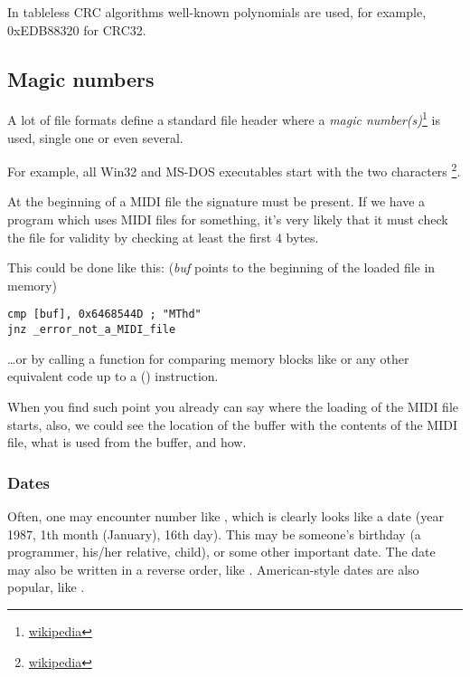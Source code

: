 In tableless CRC algorithms well-known polynomials are used, for example, 0xEDB88320 for CRC32.

\subsection{Magic numbers}
\label{magic_numbers}

\newcommand{\FNURLMAGIC}{\footnote{\href{http://go.yurichev.com/17112}{wikipedia}}}

A lot of file formats define a standard file header where a \emph{magic number(s)}\FNURLMAGIC{} is used, single one or even several.


For example, all Win32 and MS-DOS executables start with the two characters \footnote{\href{http://go.yurichev.com/17113}{wikipedia}}.


At the beginning of a MIDI file the  signature must be present. 
If we have a program which uses MIDI files for something,
it's very likely that it must check the file for validity by checking at least the first 4 bytes.

This could be done like this:
(\emph{buf} points to the beginning of the loaded file in memory)

\begin{lstlisting}[style=customasmx86]
cmp [buf], 0x6468544D ; "MThd"
jnz _error_not_a_MIDI_file
\end{lstlisting}


\dots or by calling a function for comparing memory blocks like  or any other equivalent code
up to a  () instruction.

When you find such point you already can say where the loading of the MIDI file starts,
also, we could see the location
of the buffer with the contents of the MIDI file, what is used from the buffer, and how.

\subsubsection{Dates}


Often, one may encounter number like , which is clearly looks like a date (year 1987, 1th month (January), 16th day).
This may be someone's birthday (a programmer, his/her relative, child), or some other important date.
The date may also be written in a reverse order, like .
American-style dates are also popular, like .

